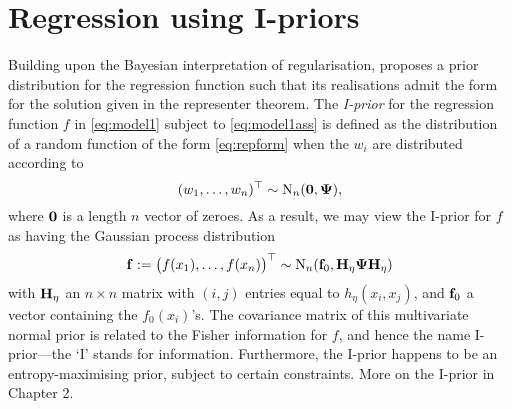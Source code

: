 \documentclass[a4paper,showframe,11pt]{report}
\begin{document}
\section{Regression using I-priors}
\label{sec:introregiprior}

Building upon the Bayesian interpretation of regularisation, \citet{bergsma2017} proposes a prior distribution for the regression function such that its realisations admit the form for the solution given in the representer theorem.
The \emph{I-prior} for the regression function $f$ in \cref{eq:model1} subject to \cref{eq:model1ass} is defined as the distribution of a random function of the form \cref{eq:repform} when the $w_i$ are distributed according to 
%
\[
  (w_1,\dots,w_n)^\top \sim \operatorname{N}_n({\mathbf 0},{\bm\Psi}),
\]
%
where ${\mathbf 0}$ is a length $n$ vector of zeroes.
As a result, we may view the I-prior for $f$ as having the Gaussian process distribution
%
\begin{align}\label{eq:iprior}
  {\mathbf f} := \big(f(x_1),\dots,f(x_n) \big)^\top \sim \operatorname{N}_n({\mathbf f}_0, {\mathbf H}_\eta{\bm\Psi}{\mathbf H}_\eta)
\end{align}
%
with ${\mathbf H}_{\eta}$ an $n \times n$ matrix with $(i,j)$ entries equal to $h_\eta(x_i,x_j)$, and ${\mathbf f}_0$ a vector containing the $f_0(x_i)$'s.
The covariance matrix of this multivariate normal prior is related to the Fisher information for $f$, and hence the name I-prior---the `I' stands for information.
Furthermore, the I-prior happens to be an entropy-maximising prior, subject to certain constraints.
More on the I-prior in Chapter 2.

\end{document}
